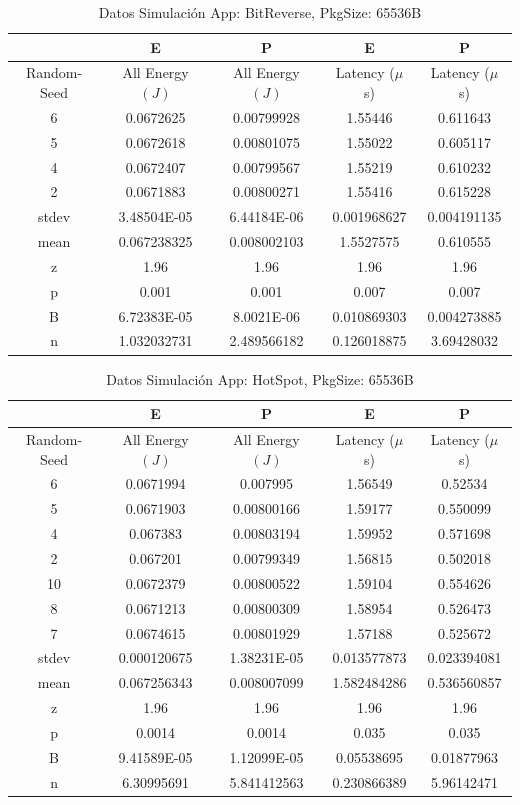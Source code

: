 \begin{table}[H]
\centering
\begin{tabular}{|c|c|c|c|c|}
\hline
 &E&P&E&P\\
\hline
Random-Seed&All Energy $(J)$&All Energy $(J)$&Latency ($\mu$ s)&Latency ($\mu$ s)\\
\hline
6&0.0672625&0.00799928&1.55446&0.611643\\
5&0.0672618&0.00801075&1.55022&0.605117\\
4&0.0672407&0.00799567&1.55219&0.610232\\
2&0.0671883&0.00800271&1.55416&0.615228\\
\hline
stdev&3.48504E-05&6.44184E-06&0.001968627&0.004191135\\
mean&0.067238325&0.008002103&1.5527575&0.610555\\
z&1.96&1.96&1.96&1.96\\
p&0.001&0.001&0.007&0.007\\
B&6.72383E-05&8.0021E-06&0.010869303&0.004273885\\
\hline
n&1.032032731&2.489566182&0.126018875&3.69428032\\
\hline
\end{tabular}
\caption{Datos Simulación App: BitReverse, PkgSize: 65536B}
\label{tb:sb65k}
\end{table}


\begin{table}[H]
\centering
\begin{tabular}{|c|c|c|c|c|}
\hline
 &E&P&E&P\\
\hline
Random-Seed&All Energy $(J)$&All Energy $(J)$&Latency ($\mu$ s)&Latency ($\mu$ s)\\
\hline
6&0.0671994&0.007995&1.56549&0.52534\\
5&0.0671903&0.00800166&1.59177&0.550099\\
4&0.067383&0.00803194&1.59952&0.571698\\
2&0.067201&0.00799349&1.56815&0.502018\\
10&0.0672379&0.00800522&1.59104&0.554626\\
8&0.0671213&0.00800309&1.58954&0.526473\\
7&0.0674615&0.00801929&1.57188&0.525672\\
\hline
stdev&0.000120675&1.38231E-05&0.013577873&0.023394081\\
mean&0.067256343&0.008007099&1.582484286&0.536560857\\
z&1.96&1.96&1.96&1.96\\
p&0.0014&0.0014&0.035&0.035\\
B&9.41589E-05&1.12099E-05&0.05538695&0.01877963\\
\hline
n&6.30995691&5.841412563&0.230866389&5.96142471\\
\hline
\end{tabular}
\caption{Datos Simulación App: HotSpot, PkgSize: 65536B}
\label{tb:sh65k}
\end{table}


